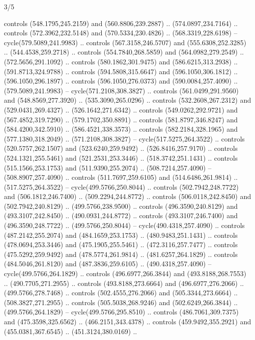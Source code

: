 \begin{flagdescription}{3/5}
\begin{scope}[xshift=0.5\flaglength]
\begin{scope}[scale=0.00167\flagwidth,yshift=210.9mm,xshift=-175.8mm]
\begin{scope}[y=-1pt, x=1pt]
  controls (548.1795,245.2159) and (560.8806,239.2887) .. (574.0897,234.7164) ..
  controls (572.3962,232.5148) and (570.5334,230.4826) .. (568.3319,228.6198) --
  cycle(579.5089,241.9983) .. controls (567.3158,246.5707) and
  (555.6308,252.3285) .. (544.4538,259.2718) .. controls (554.7840,268.5859) and
  (564.0982,279.2549) .. (572.5656,291.1092) .. controls (580.1862,301.9475) and
  (586.6215,313.2938) .. (591.8713,324.9788) .. controls (594.5808,315.6647) and
  (596.1050,306.1812) .. (596.1050,296.1897) .. controls (596.1050,276.0373) and
  (590.0084,257.4090) .. (579.5089,241.9983) -- cycle(571.2108,308.3827) ..
  controls (561.0499,291.9560) and (548.8569,277.3920) .. (535.3090,265.0296) ..
  controls (532.2608,267.2312) and (529.0431,269.4327) .. (526.1642,271.6342) ..
  controls (549.0262,292.9721) and (567.4852,319.7290) .. (579.1702,350.8891) ..
  controls (581.8797,346.8247) and (584.4200,342.5910) .. (586.4521,338.3573) ..
  controls (582.2184,328.1965) and (577.1380,318.2049) .. (571.2108,308.3827) --
  cycle(517.5275,264.3522) .. controls (520.5757,262.1507) and
  (523.6240,259.9492) .. (526.8416,257.9170) .. controls (524.1321,255.5461) and
  (521.2531,253.3446) .. (518.3742,251.1431) .. controls (515.1566,253.1753) and
  (511.9390,255.2074) .. (508.7214,257.4090) -- (508.8907,257.4090) .. controls
  (511.7697,259.6105) and (514.6486,261.9814) .. (517.5275,264.3522) --
  cycle(499.5766,250.8044) .. controls (502.7942,248.7722) and
  (506.1812,246.7400) .. (509.2294,244.8772) .. controls (506.0118,242.8450) and
  (502.7942,240.8129) .. (499.5766,238.9500) .. controls (496.3590,240.8129) and
  (493.3107,242.8450) .. (490.0931,244.8772) .. controls (493.3107,246.7400) and
  (496.3590,248.7722) .. (499.5766,250.8044) -- cycle(490.4318,257.4090) ..
  controls (487.2142,255.2074) and (484.1659,253.1753) .. (480.9483,251.1431) ..
  controls (478.0694,253.3446) and (475.1905,255.5461) .. (472.3116,257.7477) ..
  controls (475.5292,259.9492) and (478.5774,261.9814) .. (481.6257,264.1829) ..
  controls (484.5046,261.8120) and (487.3836,259.6105) .. (490.4318,257.4090) --
  cycle(499.5766,264.1829) .. controls (496.6977,266.3844) and
  (493.8188,268.7553) .. (490.7705,271.2955) .. controls (493.8188,273.6664) and
  (496.6977,276.2066) .. (499.5766,278.7468) .. controls (502.4555,276.2066) and
  (505.3344,273.6664) .. (508.3827,271.2955) .. controls (505.5038,268.9246) and
  (502.6249,266.3844) .. (499.5766,264.1829) -- cycle(499.5766,295.8510) ..
  controls (486.7061,309.7375) and (475.3598,325.6562) .. (466.2151,343.4378) ..
  controls (459.9492,355.2921) and (455.0381,367.6545) .. (451.3124,380.0169) ..

\end{scope}
\end{scope}
\end{scope}
\end{flagdescription}
